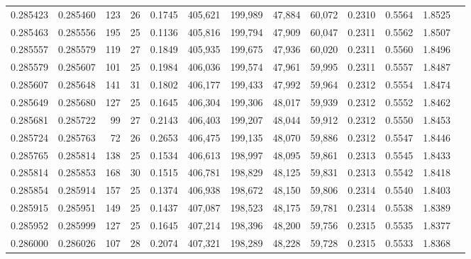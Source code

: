 \begin{tabular}{rrrrrrrrrrrrr}
0.285423 & 0.285460 &   123 &  26 &                                     0.1745 & 405,621 & 199,989 &  47,884 &  60,072 & 0.2310 & 0.5564 & 1.8525 \\
0.285463 & 0.285556 &   195 &  25 &                                     0.1136 & 405,816 & 199,794 &  47,909 &  60,047 & 0.2311 & 0.5562 & 1.8507 \\
0.285557 & 0.285579 &   119 &  27 &                                     0.1849 & 405,935 & 199,675 &  47,936 &  60,020 & 0.2311 & 0.5560 & 1.8496 \\
0.285579 & 0.285607 &   101 &  25 &                                     0.1984 & 406,036 & 199,574 &  47,961 &  59,995 & 0.2311 & 0.5557 & 1.8487 \\
0.285607 & 0.285648 &   141 &  31 &                                     0.1802 & 406,177 & 199,433 &  47,992 &  59,964 & 0.2312 & 0.5554 & 1.8474 \\
0.285649 & 0.285680 &   127 &  25 &                                     0.1645 & 406,304 & 199,306 &  48,017 &  59,939 & 0.2312 & 0.5552 & 1.8462 \\
0.285681 & 0.285722 &    99 &  27 &                                     0.2143 & 406,403 & 199,207 &  48,044 &  59,912 & 0.2312 & 0.5550 & 1.8453 \\
0.285724 & 0.285763 &    72 &  26 &                                     0.2653 & 406,475 & 199,135 &  48,070 &  59,886 & 0.2312 & 0.5547 & 1.8446 \\
0.285765 & 0.285814 &   138 &  25 &                                     0.1534 & 406,613 & 198,997 &  48,095 &  59,861 & 0.2313 & 0.5545 & 1.8433 \\
0.285814 & 0.285853 &   168 &  30 &                                     0.1515 & 406,781 & 198,829 &  48,125 &  59,831 & 0.2313 & 0.5542 & 1.8418 \\
0.285854 & 0.285914 &   157 &  25 &                                     0.1374 & 406,938 & 198,672 &  48,150 &  59,806 & 0.2314 & 0.5540 & 1.8403 \\
0.285915 & 0.285951 &   149 &  25 &                                     0.1437 & 407,087 & 198,523 &  48,175 &  59,781 & 0.2314 & 0.5538 & 1.8389 \\
0.285952 & 0.285999 &   127 &  25 &                                     0.1645 & 407,214 & 198,396 &  48,200 &  59,756 & 0.2315 & 0.5535 & 1.8377 \\
0.286000 & 0.286026 &   107 &  28 &                                     0.2074 & 407,321 & 198,289 &  48,228 &  59,728 & 0.2315 & 0.5533 & 1.8368 \\

\end{tabular}
